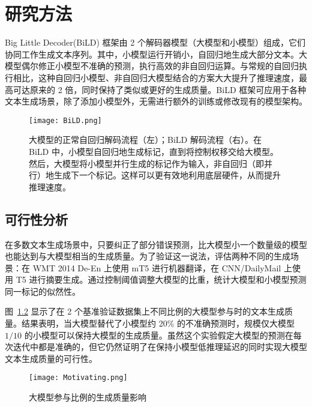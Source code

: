 \chapter{研究方法}

Big Little Decoder(BiLD) 框架由 2 个解码器模型（大模型和小模型）组成，它们协同工作生成文本序列。其中，小模型运行开销小，自回归地生成大部分文本。大模型偶尔修正小模型不准确的预测，执行高效的非自回归运算。与常规的自回归执行相比，这种自回归小模型、非自回归大模型结合的方案大大提升了推理速度，最高可达原来的 2 倍，同时保持了类似或更好的生成质量。BiLD 框架可应用于各种文本生成场景，除了添加小模型外，无需进行额外的训练或修改现有的模型架构。

\begin{figure}[htbp]
    \centering
    \texttt{[image: BiLD.png]}
    \caption{
        大模型的正常自回归解码流程（左）；BiLD 解码流程（右）。在 BiLD 中，小模型自回归地生成标记，直到将控制权移交给大模型。 然后，大模型将小模型并行生成的标记作为输入，非自回归（即并行）地生成下一个标记。这样可以更有效地利用底层硬件，从而提升推理速度。
    }
    \label{fig:BilD}
\end{figure}

\section{可行性分析}

在多数文本生成场景中，只要纠正了部分错误预测，比大模型小一个数量级的模型也能达到与大模型相当的生成质量。为了验证这一说法，评估两种不同的生成场景：在 WMT 2014 De-En 上使用 mT5 进行机器翻译，在 CNN/DailyMail 上使用 T5 进行摘要生成。通过控制阈值调整大模型的比重，统计大模型和小模型预测同一标记的似然性。

图~\ref*{fig:Motivating} 显示了在 2 个基准验证数据集上不同比例的大模型参与时的文本生成质量。结果表明，当大模型替代了小模型约 20\% 的不准确预测时，规模仅大模型 $1/10$ 的小模型可以保持大模型的生成质量。虽然这个实验假定大模型的预测在每次迭代中都是准确的，但它仍然证明了在保持小模型低推理延迟的同时实现大模型文本生成质量的可行性。

\begin{figure}[htbp]
    \centering
    \texttt{[image: Motivating.png]}
    \caption{
        大模型参与比例的生成质量影响
    }
    \label{fig:Motivating}
\end{figure}

